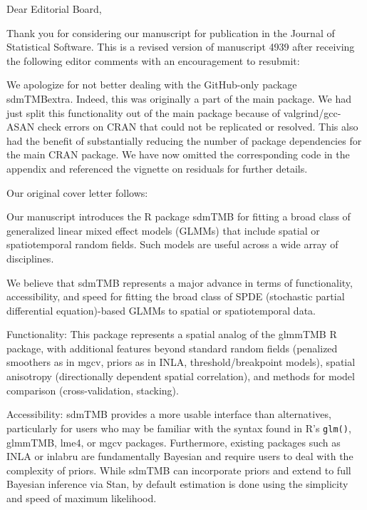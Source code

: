 \documentclass[letterpaper]{letter}
\providecommand{\pkg}[1]{{\normalfont\fontseries{b}\selectfont #1}}
\let\proglang=\textsf
\begin{document}
\begin{letter}{}
\pagestyle{empty}

\opening{Dear Editorial Board,}

Thank you for considering our manuscript for publication in the Journal of Statistical Software. This is a revised version of manuscript 4939 after receiving the following editor comments with an encouragement to resubmit:

\begin{quote}

\end{quote}

We apologize for not better dealing with the GitHub-only package \pkg{sdmTMBextra}. Indeed, this was originally a part of the main package. We had just split this functionality out of the main package because of valgrind/gcc-ASAN check errors on CRAN that could not be replicated or resolved. This also had the benefit of substantially reducing the number of package dependencies for the main CRAN package. We have now omitted the corresponding code in the appendix and referenced the vignette on residuals for further details.

Our original cover letter follows:

Our manuscript introduces the \proglang{R} package \pkg{sdmTMB} for fitting a broad class of generalized linear mixed effect models (GLMMs) that include spatial or spatiotemporal random fields. Such models are useful across a wide array of disciplines.

We believe that \pkg{sdmTMB} represents a major advance in terms of functionality, accessibility, and speed for fitting the broad class of SPDE (stochastic partial differential equation)-based GLMMs to spatial or spatiotemporal data.

Functionality: This package represents a spatial analog of the \pkg{glmmTMB} \proglang{R} package, with additional features beyond standard random fields (penalized smoothers as in \pkg{mgcv}, priors as in \pkg{INLA}, threshold/breakpoint models), spatial anisotropy (directionally dependent spatial correlation), and methods for model comparison (cross-validation, stacking).

Accessibility: \pkg{sdmTMB} provides a more usable interface than alternatives, particularly for users who may be familiar with the syntax found in \proglang{R}'s \texttt{glm()}, \pkg{glmmTMB}, \pkg{lme4}, or \pkg{mgcv} packages. Furthermore, existing packages such as \pkg{INLA} or \pkg{inlabru} are fundamentally Bayesian and require users to deal with the complexity of priors. While \pkg{sdmTMB} can incorporate priors and extend to full Bayesian inference via \pkg{Stan}, by default estimation is done using the simplicity and speed of maximum likelihood.


\end{letter}
\end{document}
